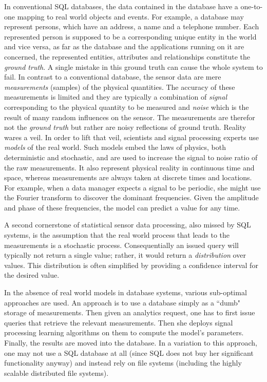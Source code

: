 In conventional SQL databases, the data contained in the database have
a one-to-one mapping to real world objects and events. For example, a
database may represent persons, which have an address, a name and a
telephone number. Each represented person is supposed to be a
corresponding unique entity in the world and vice versa, as far as the
database and the applications running on it are concerned, the
represented entities, attributes and relationships constitute the {\em
  ground truth}. A single mistake in this ground truth can cause the
whole system to fail. In contrast to a conventional database, the
sensor data are mere {\em measurements} (samples) of the physical
quantities. The accuracy of these measurements is limited and they are
typically a combination of {\em signal} corresponding to the physical
quantity to be measured and {\em noise} which is the result of many
random influences on the sensor. The measurements are therefor not the
{\em ground truth} but rather are noisy reflections of ground
truth. Reality wares a veil. In order to lift that veil, scientists
and signal processing experts use {\em models} of the real world. Such
models embed the laws of physics, both deterministic and stochastic,
and are used to increase the signal to noise ratio of the raw
measurements. It also represent physical reality in continuous time
and space, whereas measurements are always taken at discrete times and
locations. For example, when a data manager expects a signal to be
periodic, she might use the Fourier transform to discover the
dominant frequencies. Given the amplitude and phase of these
frequencies,  the model can predict a value for any time.

A second cornerstone of statistical sensor data processing, also
missed by SQL systems, is the assumption that the real world process
that leads to the measurements is a stochastic process. Consequentially
an issued query will typically not return a single value; rather, it
would return a {\em distribution} over values. This distribution is
often simplified by providing a confidence interval for the desired value.

In the absence of real world models in database systems, various
sub-optimal approaches are used. An approach is to use a database
simply as a ``dumb" storage of measurements. Then given an analytics
request, one has to first issue queries that retrieve the relevant
measurements. Then she deploys signal processing learning algorithms
on them to compute the model's parameters. Finally, the results are
moved into the database. In a variation to this approach, one may not
use a SQL database at all (since SQL does not buy her significant
functionality anyway) and instead rely on file systems (including the
highly scalable distributed file systems).

